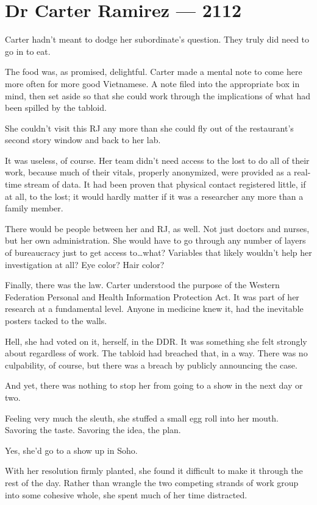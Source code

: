 \hypertarget{dr-carter-ramirez-2112}{%
\chapter*{Dr Carter Ramirez — 2112}\label{dr-carter-ramirez-2112}}

Carter hadn't meant to dodge her subordinate's question. They truly did need to go in to eat.

The food was, as promised, delightful. Carter made a mental note to come here more often for more good Vietnamese. A note filed into the appropriate box in mind, then set aside so that she could work through the implications of what had been spilled by the tabloid.

She couldn't visit this RJ any more than she could fly out of the restaurant's second story window and back to her lab.

It was useless, of course. Her team didn't need access to the lost to do all of their work, because much of their vitals, properly anonymized, were provided as a real-time stream of data. It had been proven that physical contact registered little, if at all, to the lost; it would hardly matter if it was a researcher any more than a family member.

There would be people between her and RJ, as well. Not just doctors and nurses, but her own administration. She would have to go through any number of layers of bureaucracy just to get access to\ldots{}what? Variables that likely wouldn't help her investigation at all? Eye color? Hair color?

Finally, there was the law. Carter understood the purpose of the Western Federation Personal and Health Information Protection Act. It was part of her research at a fundamental level. Anyone in medicine knew it, had the inevitable posters tacked to the walls.

Hell, she had voted on it, herself, in the DDR. It was something she felt strongly about regardless of work. The tabloid had breached that, in a way. There was no culpability, of course, but there was a breach by publicly announcing the case.

And yet, there was nothing to stop her from going to a show in the next day or two.

Feeling very much the sleuth, she stuffed a small egg roll into her mouth. Savoring the taste. Savoring the idea, the plan.

Yes, she'd go to a show up in Soho.

With her resolution firmly planted, she found it difficult to make it through the rest of the day. Rather than wrangle the two competing strands of work group into some cohesive whole, she spent much of her time distracted.

